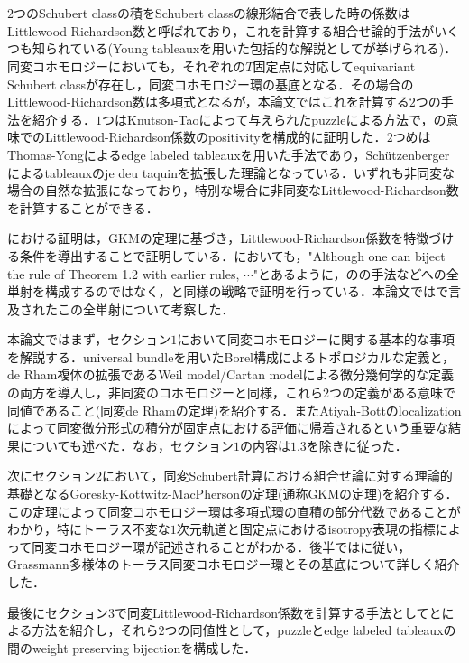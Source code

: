 \section*{}

$2$つのSchubert classの積をSchubert classの線形結合で表した時の係数はLittlewood-Richardson数と呼ばれており，これを計算する組合せ論的手法がいくつも知られている(Young tableauxを用いた包括的な解説として\cite{fulton young tableaux}が挙げられる)．同変コホモロジーにおいても，それぞれの$T$固定点に対応してequivariant Schubert classが存在し，同変コホモロジー環の基底となる．その場合のLittlewood-Richardson数は多項式となるが，本論文ではこれを計算する$2$つの手法を紹介する．$1$つはKnutson-Tao\cite{knutson tao}によって与えられたpuzzleによる方法で，\cite{positivity}の意味でのLittlewood-Richardson係数のpositivityを構成的に証明した．$2$つめはThomas-Yong\cite{thomas yong}によるedge labeled tableauxを用いた手法であり，Schützenberger\cite{schutzenberger}によるtableauxのje deu taquinを拡張した理論となっている．いずれも非同変な場合の自然な拡張になっており，特別な場合に非同変なLittlewood-Richardson数を計算することができる．

\cite{knutson tao}における証明は，GKMの定理に基づき，Littlewood-Richardson係数を特徴づける条件を導出することで証明している．\cite{thomas yong}においても，"Although one can biject the rule of Theorem 1.2
with earlier rules, $\cdots$"とあるように，\cite{knutson tao}のの手法などへの全単射を構成するのではなく，\cite{knutson tao}と同様の戦略で証明を行っている．本論文では\cite{thomas yong}で言及されたこの全単射について考察した．

本論文ではまず，セクション$1$において同変コホモロジーに関する基本的な事項を解説する．universal bundleを用いたBorel構成によるトポロジカルな定義と，de Rham複体の拡張であるWeil model/Cartan modelによる微分幾何学的な定義の両方を導入し，非同変のコホモロジーと同様，これら$2$つの定義がある意味で同値であること(同変de Rhamの定理)を紹介する．またAtiyah-Bottのlocalizationによって同変微分形式の積分が固定点における評価に帰着されるという重要な結果についても述べた．なお，セクション$1$の内容は$1.3$を除き\cite{tu equivariant}に従った．

次にセクション$2$において，同変Schubert計算における組合せ論に対する理論的基礎となるGoresky-Kottwitz-MacPhersonの定理(通称GKMの定理)を紹介する．この定理によって同変コホモロジー環は多項式環の直積の部分代数であることがわかり，特にトーラス不変な$1$次元軌道と固定点におけるisotropy表現の指標によって同変コホモロジー環が記述されることがわかる．後半では\cite{knutson tao}に従い，Grassmann多様体のトーラス同変コホモロジー環とその基底について詳しく紹介した．

最後にセクション$3$で同変Littlewood-Richardson係数を計算する手法として\cite{knutson tao}と\cite{thomas yong}による方法を紹介し，それら$2$つの同値性として，puzzleとedge labeled tableauxの間のweight preserving bijectionを構成した．